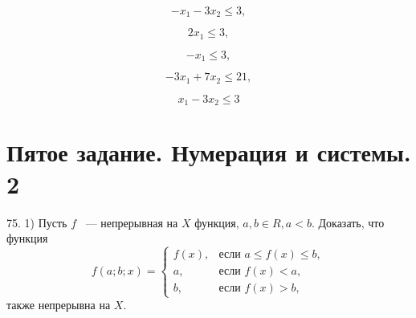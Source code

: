 \documentclass[a4paper,12pt]{article} %
\begin{document}
	\begin{equation}
		-x_1 - 3x_2 \leqslant 3,		
	\end{equation}

	\begin{equation}
		2x_1 \leqslant 3,		
	\end{equation}

	\begin{equation}
		-x_1 \leqslant 3,
	\end{equation}

	\begin{equation}
		-3x_1 + 7x_2 \leqslant 21,		
	\end{equation}

	\begin{equation}
		x_1 - 3x_2 \leqslant 3		
	\end{equation}
	\section{Пятое задание. Нумерация и системы. 2}
	75. 1) Пусть $f$ ~--- непрерывная на $X$ функция, $a, b \in R, a < b.$ Доказать, что функция
	\[
		f(a;b;x)=\begin{cases}
			f \left(x \right), &\text{если } a \leqslant f \left(x \right) \leqslant b, \\
		a, &\text{если } f \left(x \right) < a, \\
		b, &\text{если } f \left(x \right) > b,
		\end{cases}
	\]
	также непрерывна на $X.$
\end{document}
